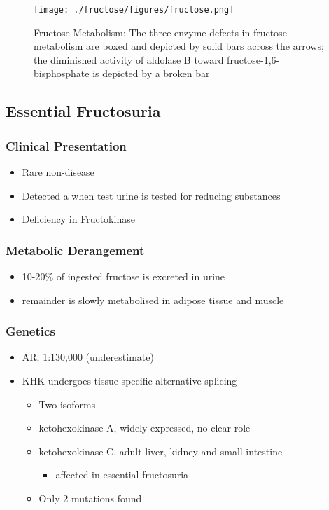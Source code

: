 \documentclass{scrartcl}
\begin{document}
\begin{figure}[htbp]
\centering
\texttt{[image: ./fructose/figures/fructose.png]}
\caption[Fructose]{\label{fig:org02bf614}
Fructose Metabolism: The three enzyme defects in fructose metabolism are boxed and depicted by solid bars across the arrows; the diminished activity of aldolase B toward fructose-1,6-bisphosphate is depicted by a broken bar}
\end{figure}

\subsection{Essential Fructosuria}
\label{sec:org94d630c}
\subsubsection{Clinical Presentation}
\label{sec:orgec14911}
\begin{itemize}
\item Rare non-disease
\item Detected a when test urine is tested for reducing substances
\item Deficiency in Fructokinase
\end{itemize}
\subsubsection{Metabolic Derangement}
\label{sec:orgb5b8a90}
\begin{itemize}
\item 10-20\% of ingested fructose is excreted in urine
\item remainder is slowly metabolised in adipose tissue and muscle
\end{itemize}
\subsubsection{Genetics}
\label{sec:orgb46914f}
\begin{itemize}
\item AR, 1:130,000 (underestimate)
\item KHK undergoes tissue specific alternative splicing
\begin{itemize}
\item Two isoforms
\item ketohexokinase A, widely expressed, no clear role
\item ketohexokinase C, adult liver, kidney and small intestine
\begin{itemize}
\item affected in essential fructosuria
\end{itemize}
\item Only 2 mutations found
\end{itemize}
\end{itemize}
\end{document}
